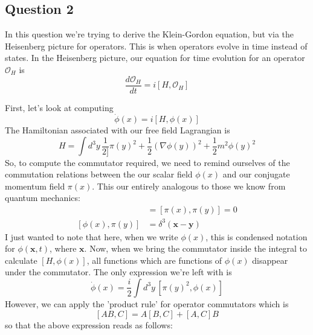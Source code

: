 \subsection{Question 2} 
In this question we're trying to derive the Klein-Gordon equation, but via the Heisenberg picture for operators. This is when operators evolve in time instead of states. In the Heisenberg picture, our equation for time evolution for an operator $\mathcal{O}_H$ is 
\[ 
\frac{ d \mathcal{O}_H}{dt}  = i [H, \mathcal{O}_H] 
\] 

First, let's look at computing 
\[ \dot{\phi}(x)  = i [ H, \phi(x) ] \] 
The Hamiltonian associated with our free field Lagrangian is \[ H = \int d^3 y \, \frac{1}{2]} \pi(y)^2 + \frac{1}{2} ( \nabla \phi(y))^2 + \frac{1}{2} m^2 \phi(y)^2 \] 
So, to compute the commutator required, we need to remind ourselves of the commutation relations between the our scalar field $\phi(x)$ and our conjugate momentum field $\pi(x)$.  This our entirely analogous to those we know from quantum mechanics: 
\begin{align*} 
[\phi(x), \phi(y) ] &= [ \pi(x), \pi(y) ] = 0 \\
[\phi(x), \pi(y) ] & = \delta^3 (\mathbf{x} - \mathbf{y}) 
\end{align*} 
I just wanted to note that here, when we write $\phi( x)$, this is condensed notation for $\phi( \mathbf{x}, t )$, where $\mathbf{x}$. Now, when we bring the commutator inside the integral to calculate $[H, \phi(x) ] $, all functions which are functions of $\phi (x) $ disappear under the commutator. The only expression we're left with is 
\[ \dot{\phi}(x) = \frac{i}{2} \int d^3 y \, [ \pi(y)^2, \phi(x) ] \] 
However, we can apply the 'product rule' for operator commutators which is \[ [AB, C] = A[B, C] + [A, C]B \] 
so that the above expression reads as follows: 



